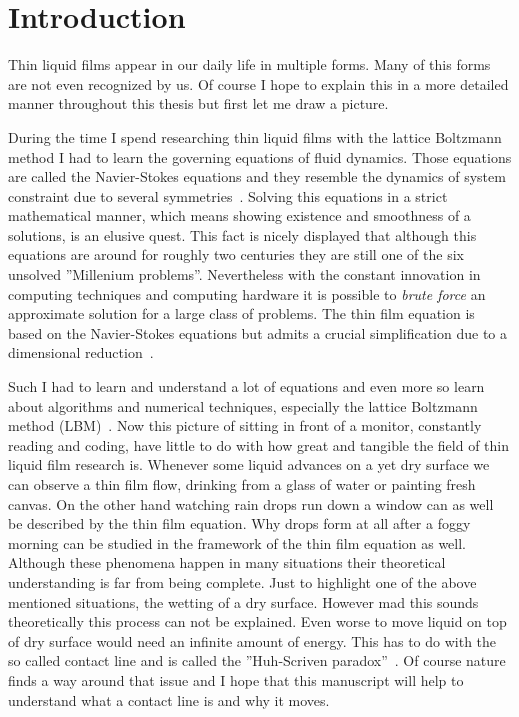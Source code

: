 \chapter{Introduction}
\label{chapter:intro}

Thin liquid films appear in our daily life in multiple forms. 
Many of this forms are not even recognized by us.
Of course I hope to explain this in a more detailed manner throughout this thesis but first let me draw a picture.

During the time I spend researching thin liquid films with the lattice Boltzmann method I had to learn the governing equations of fluid dynamics. 
Those equations are called the Navier-Stokes equations and they resemble the dynamics of system constraint due to several symmetries~\cite{Navier, Stokes}.
Solving this equations in a strict mathematical manner, which means showing existence and smoothness of a solutions, is an elusive quest. 
This fact is nicely displayed that although this equations are around for roughly two centuries they are still one of the six unsolved ''Millenium problems''.
Nevertheless with the constant innovation in computing techniques and computing hardware it is possible to \textit{brute force} an approximate solution for a large class of problems.
The thin film equation is based on the Navier-Stokes equations but admits a crucial simplification due to a dimensional reduction~\cite{ReynoldsLubr}.

Such I had to learn and understand a lot of equations and even more so learn about algorithms and numerical techniques, especially the lattice Boltzmann method (LBM)~\cite{doi:10.1146/annurev.fluid.30.1.329, PhysRevE.56.6811, PhysRevE.65.046308}.
Now this picture of sitting in front of a monitor, constantly reading and coding, have little to do with how great and tangible the field of thin liquid film research is.
Whenever some liquid advances on a yet dry surface we can observe a thin film flow, drinking from a glass of water or painting fresh canvas. 
On the other hand watching rain drops run down a window can as well be described by the thin film equation. 
Why drops form at all after a foggy morning can be studied in the framework of the thin film equation as well.
Although these phenomena happen in many situations their theoretical understanding is far from being complete.
Just to highlight one of the above mentioned situations, the wetting of a dry surface.
However mad this sounds theoretically this process can not be explained.
Even worse to move liquid on top of dry surface would need an infinite amount of energy.
This has to do with the so called contact line and is called the ''Huh-Scriven paradox''~\cite{HUH197185}.
Of course nature finds a way around that issue and I hope that this manuscript will help to understand what a contact line is and why it moves.

